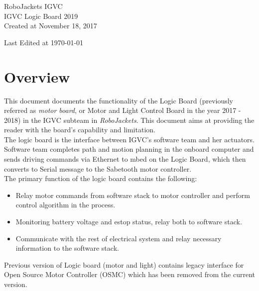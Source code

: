 \documentclass[letterpaper, 12pt]{article}
\newcommand{\cmark}{\ding{51}}%
\newcommand{\done}{\rlap{$\square$}{\raisebox{2pt}{\large\hspace{1pt}\cmark}}%
\hspace{-2.5pt}}
\begin{document}
\begin{titlepage}
\centering
	{\LARGE RoboJackets IGVC}\\
	\vspace{1cm}
	{\Large IGVC Logic Board 2019}\\
	\vfill
	{\large Created at November 18, 2017}\\
	\vspace{1cm}
	{\large Last Edited at \today\par}
\end{titlepage}

\tableofcontents



\section{Overview}
This document documents the functionality of the Logic Board (previously referred as \emph{motor board},
or Motor and Light Control Board in the year 2017 - 2018) in the IGVC subteam in \emph{RoboJackets}.
This document aims at providing the reader with the board's capability and limitation. \vspace{6pt}\\
The logic board is the interface between IGVC's software team and her actuators. Software team completes
path and motion planning in the onboard computer and sends driving commands via Ethernet to mbed on the Logic
Board, which then converts to Serial message to the Sabetooth motor controller.\\


The primary function of the logic board contains the following:
\begin{itemize}
    \item Relay motor commands from software stack to motor controller and perform control algorithm in the process.
    \item Monitoring battery voltage and estop status, relay both to software stack.
    \item Communicate with the rest of electrical system and relay necessary information to the software stack.
\end{itemize}
Previous version of Logic board (motor and light) contains legacy interface for Open Source Motor Controller (OSMC)
which has been removed from the current version.
\end{document}
